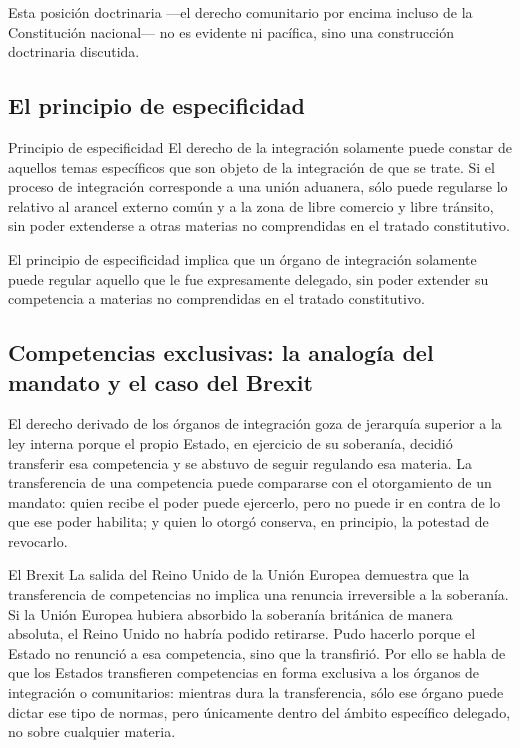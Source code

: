 \documentclass[12pt,oneside]{book}
\begin{document}
\begin{note}
Esta posición doctrinaria —el derecho comunitario por encima incluso de la Constitución nacional— no es evidente ni pacífica, sino una construcción doctrinaria discutida.
\end{note}

\subsection{El principio de especificidad}

\begin{definition}{Principio de especificidad}
El derecho de la integración solamente puede constar de aquellos temas específicos que son objeto de la integración de que se trate. Si el proceso de integración corresponde a una unión aduanera, sólo puede regularse lo relativo al arancel externo común y a la zona de libre comercio y libre tránsito, sin poder extenderse a otras materias no comprendidas en el tratado constitutivo.
\end{definition}

El principio de especificidad implica que un órgano de integración solamente puede regular aquello que le fue expresamente delegado, sin poder extender su competencia a materias no comprendidas en el tratado constitutivo.

\subsection{Competencias exclusivas: la analogía del mandato y el caso del Brexit}

El derecho derivado de los órganos de integración goza de jerarquía superior a la ley interna porque el propio Estado, en ejercicio de su soberanía, decidió transferir esa competencia y se abstuvo de seguir regulando esa materia. La transferencia de una competencia puede compararse con el otorgamiento de un mandato: quien recibe el poder puede ejercerlo, pero no puede ir en contra de lo que ese poder habilita; y quien lo otorgó conserva, en principio, la potestad de revocarlo.

\begin{example}{El Brexit}
La salida del Reino Unido de la Unión Europea demuestra que la transferencia de competencias no implica una renuncia irreversible a la soberanía. Si la Unión Europea hubiera absorbido la soberanía británica de manera absoluta, el Reino Unido no habría podido retirarse. Pudo hacerlo porque el Estado no renunció a esa competencia, sino que la transfirió. Por ello se habla de que los Estados transfieren competencias en forma exclusiva a los órganos de integración o comunitarios: mientras dura la transferencia, sólo ese órgano puede dictar ese tipo de normas, pero únicamente dentro del ámbito específico delegado, no sobre cualquier materia.
\end{example}
\end{document}
